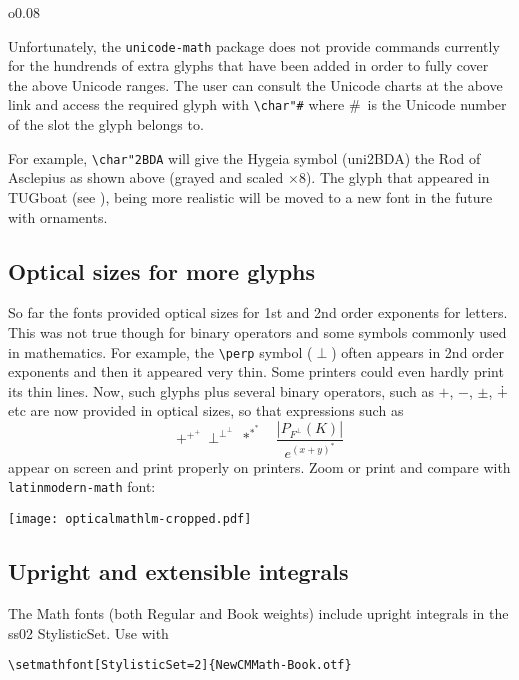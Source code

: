\documentclass{article}
\begin{document}
\begin{wrapfigure}[8]{o}{0.08\textwidth}\vspace*{-1\baselineskip}
\ \\[2ex]
\end{wrapfigure}
  Unfortunately, the \texttt{unicode-math} package does not
provide commands currently for the hundrends of extra glyphs that have been added
in order to fully cover the above Unicode ranges. The user can 
consult the Unicode charts at the above link and access the required 
glyph with \verb|\char"#| where \#\ is the Unicode number of the
slot the glyph belongs to. 

For example, \verb|\char"2BDA| will give the Hygeia symbol
(uni2BDA) the Rod of Asclepius as shown above (grayed and scaled $\times 8$). The glyph
that appeared in TUGboat (see \cite{1}), being more realistic will be moved to
a new font in the future with ornaments.

\subsection{Optical sizes for more glyphs}
So far the fonts provided optical sizes for 1st and 2nd order exponents for letters. This was
not true though for binary operators and some symbols commonly used in mathematics.
For example, the \verb|\perp| symbol ($\perp$) often appears in 2nd order exponents
and then it appeared very thin. Some printers could even hardly print its thin lines.
Now, such glyphs plus several binary operators, such as $+$, $-$, $\pm$, $\dotplus$ etc
are now provided in optical sizes, so that expressions such as
$$+^{+^+}\ \perp^{\perp^\perp}\ *^{*^*}\quad\frac{|P_{F^\perp}(K)|}{e^{(x+y)^*}}$$
appear on screen and print properly on printers.
Zoom or print and compare with \texttt{lat\-in\-modern-math} font:
\begin{center}
  \texttt{[image: opticalmathlm-cropped.pdf]}
\end{center}




\subsection{Upright and extensible integrals}
The Math fonts (both Regular and Book weights) include upright integrals
in the ss02 StylisticSet.
Use with

\medskip

\noindent\verb|\setmathfont[StylisticSet=2]{NewCMMath-Book.otf}|
\end{document}
